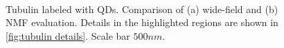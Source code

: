 %
%
%
%

%

\begin{figure}[!htb]
	\newcommand{\wf}{.47\textwidth}
	\centering
	\\
	\caption{Tubulin labeled with QDs. Comparison of (a) wide-field and (b) NMF evaluation. Details in the highlighted regions are shown in \autoref{fig:tubulin details}. Scale bar $500 \unit{nm}$.}
	\label{fig:tubulin WF and NMF}
\end{figure}

